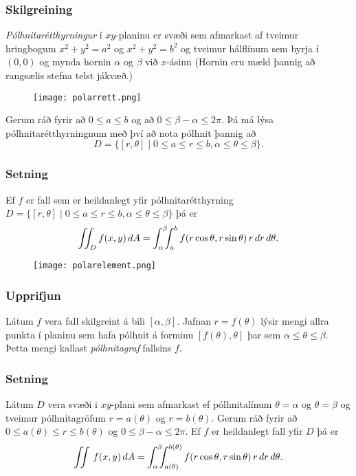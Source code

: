 \subsubsection{Skilgreining }
 {\em Pólhnitarétthyrningur} í $xy$-planinu
er svæði sem afmarkast af tveimur hringbogum $x^2+y^2=a^2$ og
$x^2+y^2=b^2$ og tveimur hálflínum sem byrja í $(0,0)$ og mynda hornin
$\alpha$ og $\beta$ við $x$-ásinn (Hornin eru mæld þannig að rangsælis
stefna telst jákvæð.) 
\begin {figure}[h!]
 \centering
            \texttt{[image: polarrett.png]}
	\caption*{}
\end {figure}
Gerum ráð fyrir að $0\leq a\leq b$ og að $0\leq\beta-\alpha\leq
2\pi$.  Þá má lýsa pólhnitarétthyrningnum með því  að nota pólhnit
þannig að 
$$D=\{[r,\theta]\mid 0\leq a\leq r\leq b, \alpha\leq \theta\leq\beta\}.$$
 



\subsubsection{Setning }
Ef $f$ er fall sem er heildanlegt yfir 
pólhnitarétthyrning
$D=\{[r,\theta]\mid 0\leq a\leq r\leq b, \alpha\leq \theta\leq\beta\}$
þá er 
$$\int\!\!\!\int_D f(x,y)\,dA=\int_\alpha^\beta\!\!\!\int_{a}^{b}
f(r\cos\theta,r\sin\theta)\,r\,dr\, d\theta.$$

\begin {figure}[h!]
 \centering
            \texttt{[image: polarelement.png]}
	\caption*{}
\end {figure}

\subsubsection{Upprifjun }
Látum $f$ vera fall skilgreint á bili 
$[\alpha,\beta]$.  Jafnan $r=f(\theta)$ lýsir mengi allra punkta í
planinu sem hafa pólhnit á forminu $[f(\theta),\theta]$ þar sem
$\alpha\leq\theta\leq\beta$.  Þetta mengi kallast {\em pólhnitagraf}
fallsins $f$. 


\subsubsection{Setning }
Látum $D$ vera svæði i $xy$-plani sem
afmarkast ef pólhnitalínum $\theta=\alpha$ og $\theta=\beta$ og
tveimur pólhnitagröfum $r=a(\theta)$ og $r=b(\theta)$.  Gerum ráð
fyrir að $0\leq a(\theta)\leq
r\leq b(\theta)$ og $0\leq \beta-\alpha\leq 2\pi$.
Ef $f$ er heildanlegt fall yfir $D$
þá er 
$$ \int\!\!\!\int\,f(x,y)\,dA=\int_\alpha^\beta\!\!\!\int_{a(\theta)}^{b(\theta)}
f(r\cos\theta,r\sin\theta)\,r\,dr\, d\theta.$$


